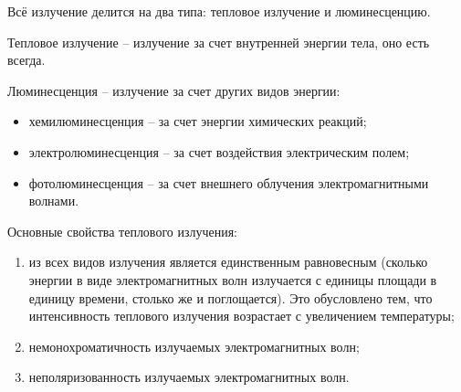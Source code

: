 
Всё излучение делится на два типа: тепловое излучение и люминесценцию.

Тепловое излучение -- излучение за счет внутренней энергии тела, оно есть
всегда.

Люминесценция -- излучение за счет других видов энергии:
\begin{itemize}
    \item хемилюминесценция -- за счет энергии химических реакций;
    \item электролюминесценция -- за счет воздействия электрическим полем;
    \item фотолюминесценция -- за счет внешнего облучения электромагнитными
        волнами.
\end{itemize}

Основные свойства теплового излучения:
\begin{enumerate}
    \item из всех видов излучения является единственным равновесным (сколько
        энергии в виде электромагнитных волн излучается с единицы площади
        в единицу времени, столько же и поглощается). Это обусловлено тем,
        что интенсивность теплового излучения возрастает с увеличением
        температуры;
    \item немонохроматичность излучаемых электромагнитных волн;
    \item неполяризованность излучаемых электромагнитных волн.
\end{enumerate}

